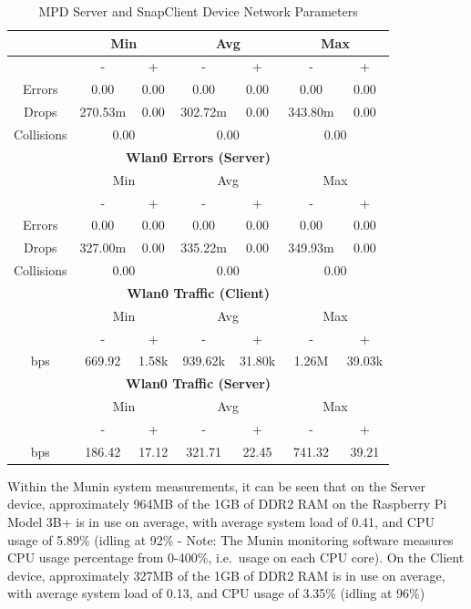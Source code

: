 \documentclass[11pt,a4paper,headinclude=false,footinclude=false]{scrreprt}
\begin{document}
\begin{table}[H]
\begin{tabular}{||c|c|c|c|c|c|c||}
    \hline\hline
      & \multicolumn{2}{|c|}{Min} & \multicolumn{2}{|c|}{Avg} & \multicolumn{2}{|c|}{Max} \\
    \hline
      & - & + & - & + & - & + \\
    \hline
    Errors  & 0.00 & 0.00 & 0.00 & 0.00 & 0.00 & 0.00 \\
    \hline
    Drops & 270.53m & 0.00 & 302.72m & 0.00 & 343.80m & 0.00 \\
    \hline
    Collisions & \multicolumn{2}{|c|}{0.00} & \multicolumn{2}{|c|}{0.00} & \multicolumn{2}{|c|}{0.00} \\
    \hline\hline
    \multicolumn{7}{|c|}{\textbf{Wlan0 Errors (Server)}} \\
    \hline\hline
      & \multicolumn{2}{|c|}{Min} & \multicolumn{2}{|c|}{Avg} & \multicolumn{2}{|c|}{Max} \\
    \hline
      & - & + & - & + & - & + \\
    \hline
    Errors  & 0.00 & 0.00 & 0.00 & 0.00 & 0.00 & 0.00 \\
    \hline
    Drops & 327.00m & 0.00 & 335.22m & 0.00 & 349.93m & 0.00 \\
    \hline
    Collisions & \multicolumn{2}{|c|}{0.00} & \multicolumn{2}{|c|}{0.00} & \multicolumn{2}{|c|}{0.00} \\
    \hline\hline
    \multicolumn{7}{|c|}{\textbf{Wlan0 Traffic (Client)}} \\
    \hline\hline
      & \multicolumn{2}{|c|}{Min} & \multicolumn{2}{|c|}{Avg} & \multicolumn{2}{|c|}{Max} \\
    \hline
      & - & + & - & + & - & + \\
    \hline
    bps  & 669.92 & 1.58k & 939.62k & 31.80k & 1.26M & 39.03k \\
    \hline\hline
    \multicolumn{7}{|c|}{\textbf{Wlan0 Traffic (Server)}} \\
    \hline\hline
      & \multicolumn{2}{|c|}{Min} & \multicolumn{2}{|c|}{Avg} & \multicolumn{2}{|c|}{Max} \\
    \hline
      & - & + & - & + & - & + \\
    \hline
    bps  & 186.42 & 17.12 & 321.71 & 22.45 & 741.32 & 39.21 \\
    \hline\hline
    \end{tabular}
    \caption{MPD Server and SnapClient Device Network Parameters}
    \label{MPDclientserverNetTab}
\end{table}

Within the Munin system measurements, it can be seen that on the Server
device, approximately 964MB of the 1GB of DDR2 RAM on the Raspberry Pi
Model 3B+ is in use on average, with average system load of 0.41, and
CPU usage of 5.89\% (idling at 92\% - Note: The Munin monitoring
software measures CPU usage percentage from 0-400\%, i.e.~usage on each
CPU core). On the Client device, approximately 327MB of the 1GB of DDR2
RAM is in use on average, with average system load of 0.13, and CPU
usage of 3.35\% (idling at 96\%)
\end{document}
